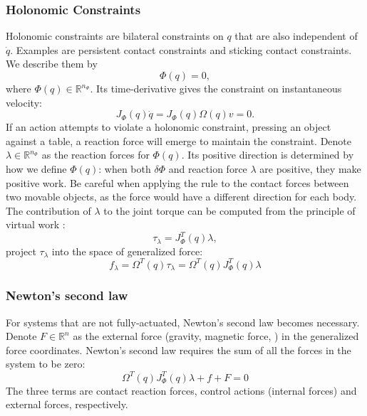 \subsubsection{Holonomic Constraints} %
\label{subsub:holonomic_constraints}
Holonomic constraints are bilateral constraints on $q$ that are also independent of $\dot q$. Examples are persistent contact constraints and sticking contact constraints. We describe them by
\begin{equation}
\label{eq:holonomic_constraints}
	\Phi(q)=0,
\end{equation}
where $\Phi(q)\in \mathbb{R}^{n_\Phi}$. Its time-derivative gives the constraint on instantaneous velocity:
\begin{equation}
\label{eq: holonomic_constraints_on_velocity}
	J_\Phi(q)\dot q=J_\Phi(q)\Omega(q)v=0.
\end{equation}
%
If an action attempts to violate a holonomic constraint, \eg pressing an object against a table, a reaction force will emerge to maintain the constraint.
Denote $\lambda\in \mathbb{R}^{n_\Phi}$ as the reaction forces for $\Phi(q)$.
Its positive direction is determined by how we define $\Phi(q)$: when both $\delta\Phi$ and reaction force $\lambda$ are positive, they make positive work. Be careful when applying the rule to the contact forces between two movable objects, as the force would have a different direction for each body.
The contribution of $\lambda$ to the joint torque can be computed from the principle of virtual work \cite{villani2008force}:
$$\tau_\lambda=J^T_\Phi(q)\lambda,$$
project $\tau_\lambda$ into the space of generalized force:
\begin{equation}
	f_\lambda=\Omega^T(q)\tau_\lambda=\Omega^T(q)J^T_\Phi(q)\lambda
\end{equation}
%


%
%
\subsubsection{Newton's second law} %
\label{subsub:newton_s_second_law}
For systems that are not fully-actuated, Newton's second law becomes necessary.
Denote $F \in \mathbb{R}^{n}$ as the external force (gravity, magnetic force, \etc) in the generalized force coordinates.
Newton's second law requires the sum of all the forces in the system to be zero:
\begin{equation}
\label{eq:newton_second_law}
	 \Omega^T(q)J^T_\Phi(q)\lambda + f + F = 0
\end{equation}
%
The three terms are contact reaction forces, control actions (internal forces) and external forces, respectively.
%

